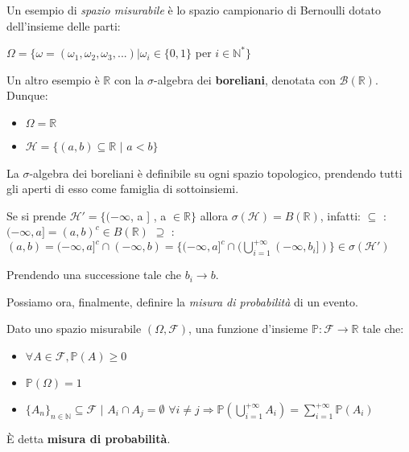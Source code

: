 \begin{example}
Un esempio di \textit{spazio misurabile} è lo spazio campionario di Bernoulli dotato dell'insieme delle parti:
\begin{center}
    $\Omega=\{\omega=(\omega_1,\omega_2,\omega_3,...) | \omega_i \in \{0,1\}$ per $i\in\mathbb{N}^*\}$
\end{center}
\end{example}
\begin{example}
Un altro esempio è $\mathbb{R}$ con la $\sigma$-algebra dei \textbf{boreliani}, denotata con $\mathcal{B}(\mathbb{R})$. Dunque:
\begin{itemize}
    \item $\Omega=\mathbb{R}$
    \item $\mathscr{H}=\{(a,b)\subseteq\mathbb{R}$ $|$ $a<b \}$
\end{itemize}
La $\sigma$-algebra dei boreliani è definibile su ogni spazio topologico, prendendo tutti gli aperti di esso come famiglia di sottoinsiemi.

\begin{observation}
Se si prende $\mathscr{H}'=\{(-\infty$, a ] , a $\in\mathbb{R}\}$ allora $\sigma(\mathscr{H})=B(\mathbb{R})$, infatti:
\newline
$\subseteq$ : $(-\infty, a]=(a, b)^c\in B(\mathbb{R})$
\newline
$\supseteq$ : $(a, b)=(-\infty , a]^c\cap(-\infty , b)=\{(-\infty , a]^c\cap(\bigcup\limits_{i=1}^{+\infty}(-\infty , b_i])\}\in\sigma(\mathscr{H}')$ 

Prendendo una successione tale che $b_i\rightarrow b$.
\end{observation}
\end{example}
\vspace{10px} 
Possiamo ora, finalmente, definire la \textit{misura di probabilità} di un evento.
\begin{definition}
Dato uno spazio misurabile $(\Omega , \mathscr{F})$, una funzione d'insieme
\newline
$\mathbb{P}:\mathscr{F}\longrightarrow\mathbb{R}$ tale che:
\begin{itemize}
    \item $\forall A\in\mathscr{F} , \mathbb{P}(A)\geq0$
    \item $\mathbb{P}(\Omega)=1$
    \item $\{A_n\}_{n\in\mathbb{N}}\subseteq\mathscr{F}$ $|$ $A_i\cap A_j=\emptyset$  $\forall i\neq j \Rightarrow \mathbb{P}(\bigcup\limits^{+\infty}_{i=1}A_i)=\sum\limits_{i=1}^{+\infty}\mathbb{P}(A_i)$
\end{itemize}
\`E detta \textbf{misura di probabilità}.
\end{definition}

